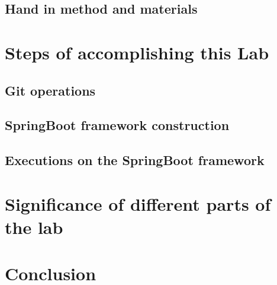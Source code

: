 \documentclass[a4paper]{report}
\begin{document}
\section{Hand in method and materials}
\chapter{Steps of accomplishing this Lab}
\section{Git operations}
\section{SpringBoot framework construction}
\section{Executions on the SpringBoot framework}
\chapter{Significance of different parts of the lab}
\chapter{Conclusion}
\end{document}
